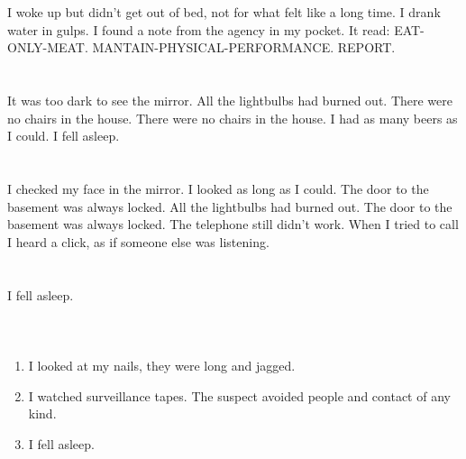 \documentclass{article}
\begin{document}
    \section{}
    I woke up but didn't get out of bed, not for what felt like a long time. I drank water in gulps. I found a note from the agency in my pocket. It read: EAT-ONLY-MEAT. MANTAIN-PHYSICAL-PERFORMANCE. REPORT.  
    \newpage
    
    \section{}
    It was too dark to see the mirror. All the lightbulbs had burned out. There were no chairs in the house. There were no chairs in the house. I had as many beers as I could. I fell asleep.  
    \newpage
    
    \section{}
    I checked my face in the mirror. I looked as long as I could. The door to the basement was always locked. All the lightbulbs had burned out. The door to the basement was always locked. The telephone still didn't work. When I tried to call I heard a click, as if someone else was listening.  
    \newpage
    
    \section{}
    I fell asleep.\\\\ 
    \newpage
    
    \section{}
    
    \begin{enumerate}
    
    \item I looked at my nails, they were long and jagged.\\
    
    \item I watched surveillance tapes. The suspect avoided people and contact of any kind.\\
    
    \item I fell asleep.\\
    
    \end{enumerate}
     
\end{document}
